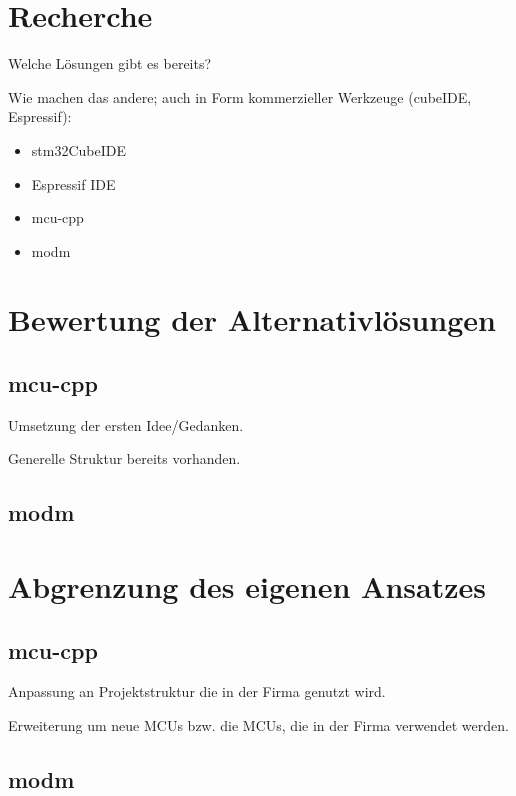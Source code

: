 \section{Recherche}
Welche Lösungen gibt es bereits?

Wie machen das andere; auch in Form kommerzieller Werkzeuge (cubeIDE, Espressif):
\begin{itemize}
	\item stm32CubeIDE
	\item Espressif IDE
	\item mcu-cpp
	\item modm
\end{itemize}

\section{Bewertung der Alternativlösungen}


\subsection{mcu-cpp}
Umsetzung der ersten Idee/Gedanken.

Generelle Struktur bereits vorhanden.

\subsection{modm}


\section{Abgrenzung des eigenen Ansatzes}
\subsection{mcu-cpp}
Anpassung an Projektstruktur die in der Firma genutzt wird.

Erweiterung um neue MCUs bzw. die MCUs, die in der Firma verwendet werden.

\subsection{modm}


